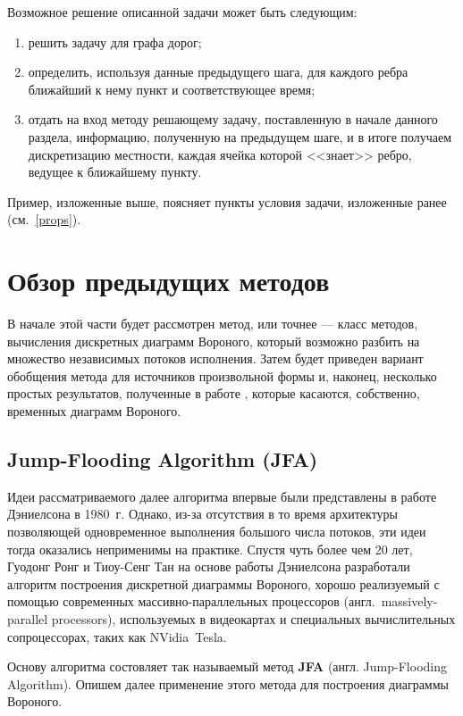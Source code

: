 \documentclass[12pt]{article}
\begin{document}
Возможное решение описанной задачи может быть следующим:
\begin{enumerate}
\item решить задачу для графа дорог;
\item определить, используя данные предыдущего шага, для каждого ребра 
ближайший к нему пункт и соответствующее время;
\item отдать на вход методу решающему задачу, поставленную в начале
данного раздела, информацию, полученную на предыдущем шаге,
и в итоге получаем дискретизацию местности, каждая ячейка которой
<<знает>> ребро, ведущее к ближайшему пункту.
\end{enumerate}

Пример, изложенные выше, поясняет пункты условия задачи, изложенные ранее 
(см.~\ref{props}).

\section{Обзор предыдущих методов}
\label{past}
В начале этой части будет рассмотрен метод, или точнее --- класс методов, 
вычисления дискретных диаграмм Вороного, который возможно разбить
на множество независимых потоков исполнения. Затем будет приведен
вариант обобщения метода для источников произвольной формы и, 
наконец, несколько простых результатов, полученные в работе \cite{timeb}, 
которые касаются, собственно, временных диаграмм Вороного.

\subsection{Jump-Flooding Algorithm (JFA)}
\label{jfa_desc}
Идеи рассматриваемого далее алгоритма впервые были представлены в работе
Дэниелсона \cite{distmap} в 1980~г. Однако, из-за отсутствия в то время
архитектуры позволяющей одновременное выполнения большого числа потоков,
эти идеи тогда оказались неприменимы на практике. Спустя чуть более чем 20 лет, 
Гуодонг Ронг и Тиоу-Сенг Тан \cite{jfa} на основе работы Дэниелсона разработали 
алгоритм построения дискретной диаграммы Вороного, хорошо реализуемый
с помощью современных массивно-параллельных процессоров 
(англ.~massively-parallel processors), используемых в видеокартах и
специальных вычислительных сопроцессорах, таких как NVidia\textregistered \, 
Tesla\texttrademark.


Основу алгоритма состовляет так называемый метод \textbf{JFA} (англ.
Jump-Flooding Algorithm). Опишем далее применение этого метода для 
построения диаграммы Вороного. 
\end{document}
